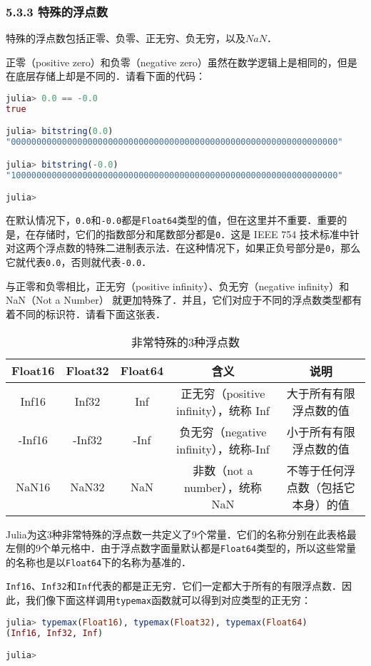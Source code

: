 \subsubsection{5.3.3 特殊的浮点数}

特殊的浮点数包括正零、负零、正无穷、负无穷，以及$NaN$．

正零（positive zero）和负零（negative zero）虽然在数学逻辑上是相同的，但是在底层存储上却是不同的．请看下面的代码：
\begin{lstlisting}[language=julia]
julia> 0.0 == -0.0 
true

julia> bitstring(0.0)
"0000000000000000000000000000000000000000000000000000000000000000"

julia> bitstring(-0.0)
"1000000000000000000000000000000000000000000000000000000000000000"

julia> 
\end{lstlisting}

在默认情况下，\verb|0.0|和\verb|-0.0|都是\verb|Float64|类型的值，但在这里并不重要．重要的是，在存储时，它们的指数部分和尾数部分都是\verb|0|．这是 IEEE 754 技术标准中针对这两个浮点数的特殊二进制表示法．在这种情况下，如果正负号部分是\verb|0|，那么它就代表\verb|0.0|，否则就代表\verb|-0.0|．

与正零和负零相比，正无穷（positive infinity）、负无穷（negative infinity）和 NaN（Not a Number） 就更加特殊了．并且，它们对应于不同的浮点数类型都有着不同的标识符．请看下面这张表．
\begin{table}[ht]
\centering
\caption{非常特殊的3种浮点数}\label{JuC5S3_tab2}
\begin{tabular}{|c|c|c|c|c|}
\hline
Float16 & Float32 & Float64 & 含义 & 说明 \\
\hline
Inf16 & Inf32 & Inf & 正无穷（positive infinity），统称 Inf & 大于所有有限浮点数的值 \\
\hline
-Inf16 & -Inf32 & -Inf & 负无穷（negative infinity），统称-Inf & 小于所有有限浮点数的值 \\
\hline
NaN16 & NaN32 & NaN & 非数（not a number），统称 NaN & 不等于任何浮点数（包括它本身）的值 \\
\hline
\end{tabular}
\end{table}

Julia为这3种非常特殊的浮点数一共定义了9个常量．它们的名称分别在此表格最左侧的9个单元格中．由于浮点数字面量默认都是\verb|Float64|类型的，所以这些常量的名称也是以\verb|Float64|下的名称为基准的．

\verb|Inf16|、\verb|Inf32|和\verb|Inf|代表的都是正无穷．它们一定都大于所有的有限浮点数．因此，我们像下面这样调用\verb|typemax|函数就可以得到对应类型的正无穷：
\begin{lstlisting}[language=julia]
julia> typemax(Float16), typemax(Float32), typemax(Float64)
(Inf16, Inf32, Inf)

julia> 
\end{lstlisting}

